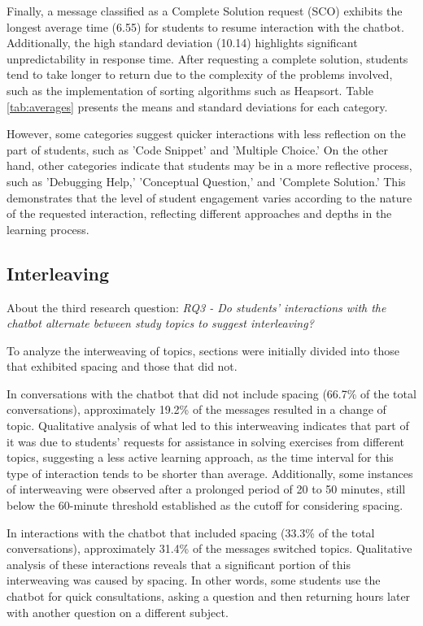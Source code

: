 \documentclass[runningheads]{llncs}
\begin{document}
Finally, a message classified as a Complete Solution request (SCO) exhibits the
longest average time (6.55) for students to resume interaction with the chatbot.
Additionally, the high standard deviation (10.14) highlights significant
unpredictability in response time. After requesting a complete solution,
students tend to take longer to return due to the complexity of the problems
involved, such as the implementation of sorting algorithms such as Heapsort. Table
\ref{tab:averages} presents the means and standard deviations for each
category.

However, some categories suggest quicker interactions with less reflection on
the part of students, such as 'Code Snippet' and 'Multiple Choice.' On the other
hand, other categories indicate that students may be in a more reflective
process, such as 'Debugging Help,' 'Conceptual Question,' and 'Complete
Solution.' This demonstrates that the level of student engagement varies
according to the nature of the requested interaction, reflecting different
approaches and depths in the learning process.

\subsection{Interleaving}

About the third research question: \textit{RQ3 - Do students' interactions with
the chatbot alternate between study topics to suggest interleaving?}

To analyze the interweaving of topics, sections were initially divided into
those that exhibited spacing and those that did not.

In conversations with the chatbot that did not include spacing (66.7\% of the total
conversations), approximately 19.2\% of the messages resulted in a change of
topic. Qualitative analysis of what led to this interweaving indicates that
part of it was due to students' requests for assistance in solving exercises
from different topics, suggesting a less active learning approach, as the time
interval for this type of interaction tends to be shorter than average.
Additionally, some instances of interweaving were observed after a prolonged
period of 20 to 50 minutes, still below the 60-minute threshold established as
the cutoff for considering spacing.

In interactions with the chatbot that included spacing (33.3\% of the total
conversations), approximately 31.4\% of the messages switched topics.
Qualitative analysis of these interactions reveals that a significant portion
of this interweaving was caused by spacing. In other words, some students use
the chatbot for quick consultations, asking a question and then returning hours
later with another question on a different subject.
\end{document}
